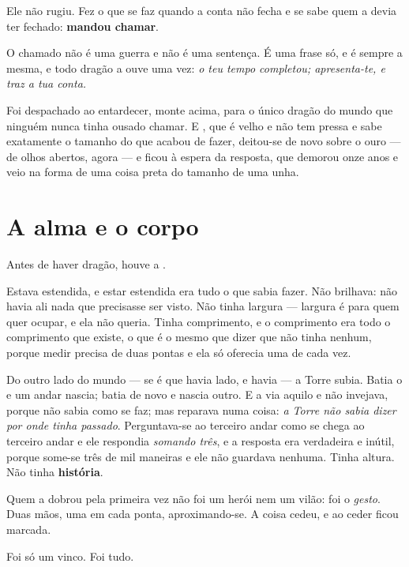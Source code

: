 \documentclass[livro.tex]{subfiles}
\begin{document}
\medskip

Ele não rugiu. Fez o que se faz quando a conta não fecha e se sabe quem a devia ter fechado:
\textbf{mandou chamar}.

O chamado não é uma guerra e não é uma sentença. É uma frase só, e é sempre a mesma, e todo
dragão a ouve uma vez: \emph{o teu tempo completou; apresenta-te, e traz a tua conta.}

Foi despachado ao entardecer, monte acima, para o único dragão do mundo que ninguém nunca tinha
ousado chamar. E \Odo , que é velho e não tem pressa e sabe exatamente o tamanho do que acabou de
fazer, deitou-se de novo sobre o ouro --- de olhos abertos, agora --- e ficou à espera da
resposta, que demorou onze anos e veio na forma de uma coisa preta do tamanho de uma unha.

\chapter{A alma e o corpo}

Antes de haver dragão, houve a \Fit .

Estava estendida, e estar estendida era tudo o que sabia fazer. Não brilhava: não havia ali nada
que precisasse ser visto. Não tinha largura --- largura é para quem quer ocupar, e ela não
queria. Tinha comprimento, e o comprimento era todo o comprimento que existe, o que é o mesmo
que dizer que não tinha nenhum, porque medir precisa de duas pontas e ela só oferecia uma de
cada vez.

Do outro lado do mundo --- se é que havia lado, e havia --- a Torre subia. Batia o \Opr e um
andar nascia; batia de novo e nascia outro. E a \Fit via aquilo e não invejava, porque não sabia
como se faz; mas reparava numa coisa: \emph{a Torre não sabia dizer por onde tinha passado}.
Perguntava-se ao terceiro andar como se chega ao terceiro andar e ele respondia \emph{somando
três}, e a resposta era verdadeira e inútil, porque some-se três de mil maneiras e ele não
guardava nenhuma. Tinha altura. Não tinha \textbf{história}.

\medskip

Quem a dobrou pela primeira vez não foi um herói nem um vilão: foi o \emph{gesto}. Duas mãos,
uma em cada ponta, aproximando-se. A coisa cedeu, e ao ceder ficou marcada.

Foi só um vinco. Foi tudo.
\end{document}
